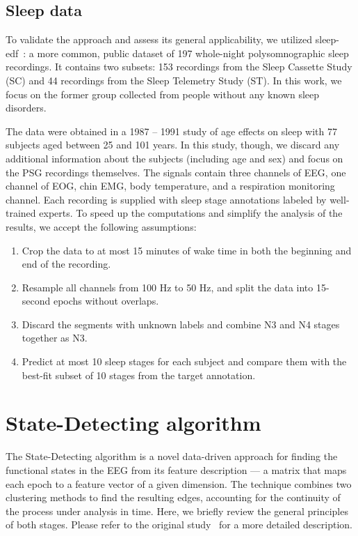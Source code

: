\documentclass[10pt]{iopart}
\begin{document}
\subsection{Sleep data}

To validate the approach and assess its general applicability, we utilized sleep-edf~\cite{SleepEdf,PhysioNet}: a more common, public dataset of 197 whole-night polysomnographic sleep recordings. It contains two subsets: 153 recordings from the Sleep Cassette Study (SC) and 44 recordings from the Sleep Telemetry Study (ST). In this work, we focus on the former group collected from people without any known sleep disorders.

The data were obtained in a 1987 -- 1991 study of age effects on sleep with 77 subjects aged between 25 and 101 years. In this study, though, we discard any additional information about the subjects (including age and sex) and focus on the PSG recordings themselves. The signals contain three channels of EEG, one channel of EOG, chin EMG, body temperature, and a respiration monitoring channel. Each recording is supplied with sleep stage annotations labeled by well-trained experts. To speed up the computations and simplify the analysis of the results, we accept the following assumptions:

\begin{enumerate}
    \item
        Crop the data to at most 15 minutes of wake time in both the beginning and end of the recording.
    \item
        Resample all channels from 100 Hz to 50 Hz, and split the data into 15-second epochs without overlaps.
    \item
        Discard the segments with unknown labels and combine N3 and N4 stages together as N3.
    \item
        Predict at most 10 sleep stages for each subject and compare them with the best-fit subset of 10 stages from the target annotation.
\end{enumerate}

\section{State-Detecting algorithm}

The State-Detecting algorithm is a novel data-driven approach for finding the functional states in the EEG from its feature description --- a matrix that maps each epoch to a feature vector of a given dimension. The technique combines two clustering methods to find the resulting edges, accounting for the continuity of the process under analysis in time. Here, we briefly review the general principles of both stages. Please refer to the original study~\cite{SDA} for a more detailed description.
\end{document}
